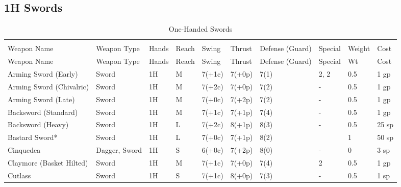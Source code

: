 \documentclass[oneside,11pt,english]{book}
\begin{document}
\subsection{1H Swords}\vspace{-15pt}
\begin{longtabu} to 1\linewidth {X[2,l]XX[-1,c]X[-1,c]XXX[-1,c]X[2,l]X[-3,c]X[-3,r]}
	\captionsetup{labelformat=blank,textformat=empty}
	\caption{One-Handed Swords}\vspace{-15pt}
	\label{tab:1H Swords}\\
		Weapon Name						&Weapon Type	&Hands&Reach&Swing&Thrust&Defense (Guard)&Special						&Weight	&Cost\\\toprule\endfirsthead
Weapon Name					&Weapon Type    &Hands   &Reach  &Swing  &Thrust &Defense (Guard)  &Special                                 &Wt  &Cost\\\toprule\endhead
Arming Sword (Early)        &Sword          &1H      &M      &7(+1c) &7(+0p) &7(1)           & 2,  2                 &0.5 &1 gp\\
Arming Sword (Chivalric)    &Sword          &1H      &M      &7(+2c) &7(+0p) &7(2)           &-                                       &0.5 &1 gp\\
Arming Sword (Late)         &Sword          &1H      &M      &7(+0c) &7(+2p) &7(2)           &-                                       &0.5 &1 gp\\
Backsword (Standard)        &Sword          &1H      &M      &7(+1c) &7(+1p) &7(4)           &-                                       &0.5 &1 gp\\
Backsword (Heavy)           &Sword          &1H      &L      &7(+2c) &8(+1p) &8(3)           &-                                       &0.5 &25 sp\\
Bastard Sword*              &Sword          &1H      &L      &7(+0c) &7(+1p) &8(2)           &                            &1   &50 sp\\
Cinquedea                   &Dagger, Sword  &1H      &S      &6(+0c) &7(+2p) &8(0)           &-                                       &0   &3 sp\\
Claymore (Basket Hilted)	&Sword		&1H      &M      &7(+1c) &7(+0p) &7(4)           & 2                           &0.5 &1 gp\\
Cutlass						&Sword          &1H      &S      &7(+1c) &8(+0p) &7(3)           &-                                       &0.5 &1 sp\\

\end{longtabu}
\end{document}
